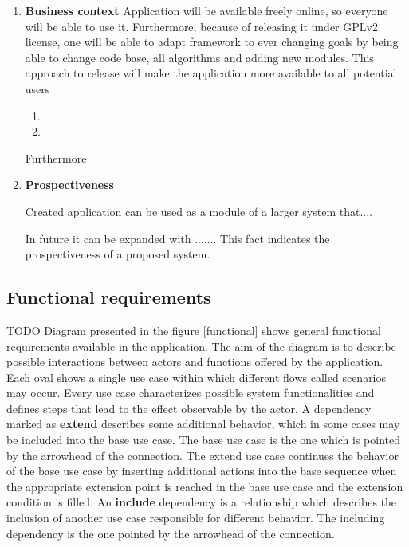 	\begin{enumerate}
	
	\item \textbf{Business context}
	Application will be available freely online, so everyone will be able to use it. Furthermore, because of releasing it under GPLv2 license, one will be able to adapt framework to ever changing goals by being able to change code base, all algorithms and adding new modules. This approach to release will make the application more available to all potential users
	
	\begin{enumerate}
	
	\item 
	
	\item 
	
	\end{enumerate}
	
	Furthermore 
	
	\item \textbf{Prospectiveness}
	
	Created application can be used as a module of a larger system that.... 
	
	In future it can be expanded with ....... This fact indicates the prospectiveness of a proposed system. 
	
	\end{enumerate}

\subsection{Functional requirements}
TODO
Diagram presented in the figure \ref{functional} shows general functional requirements available in the application. The aim of the diagram is to describe possible interactions between actors and functions offered by the application. Each oval shows a single use case within which different flows called scenarios may occur. Every use case characterizes possible system functionalities and defines steps that lead to the effect observable by the actor. A dependency marked as \textbf{extend} describes some additional behavior, which in some cases may be included into the base use case. 
The base use case is the one which is pointed by the arrowhead of the connection. The extend use case continues the behavior of the base use case by inserting additional actions into the base sequence when the appropriate extension point is reached in the base use case and the extension condition is filled. An \textbf{include} dependency is a relationship which describes the inclusion of another use case responsible for different behavior. The including dependency is the one pointed by the arrowhead of the connection.


